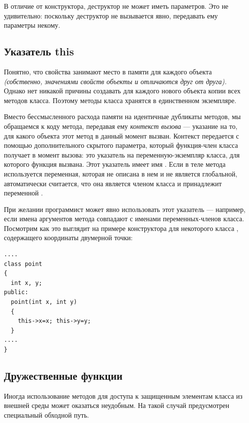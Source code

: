 В отличие от конструктора, деструктор не может иметь параметров. Это не удивительно: поскольку деструктор не вызывается
явно, передавать ему параметры некому.

\subsection[Указатель this]{Указатель this}
Понятно, что свойства занимают место в памяти для каждого объекта \emph{(собственно, значениями
свойств объекты и отличаются друг от друга).} Однако нет никакой причины создавать для каждого нового объекта копии
всех методов класса. Поэтому методы класса хранятся в единственном экземпляре. 

Вместо бессмысленного расхода памяти на идентичные дубликаты методов, мы обращаемся к коду метода, передавая ему
\emph{контекст вызова} --- указание на то, для какого объекта этот метод в данный момент вызван.
Контекст передается с  помощью дополнительного скрытого параметра, который функция-член класса получает в момент
вызова: это указатель на переменную-экземпляр класса, для которого функция вызвана. Этот указатель имеет имя
. Если в теле метода используется переменная, которая не описана в нем и не является
глобальной, автоматически считается, что она является членом класса и принадлежит переменной
. 

При желании программист может явно использовать этот указатель --- например, если имена аргументов метода совпадают с
именами переменных-членов класса. Посмотрим как это выглядит на примере конструктора для некоторого класса
, содержащего координаты двумерной точки:
\begin{lstlisting}
....
class point 
{
  int x, y;
public:
  point(int x, int y) 
  {
    this->x=x; this->y=y;
  }
....
}
\end{lstlisting}

\subsection[Дружественные функции]{Дружественные функции}
Иногда использование методов для доступа к защищенным элементам класса из внешней среды может оказаться неудобным. На
такой случай предусмотрен специальный обходной путь.

